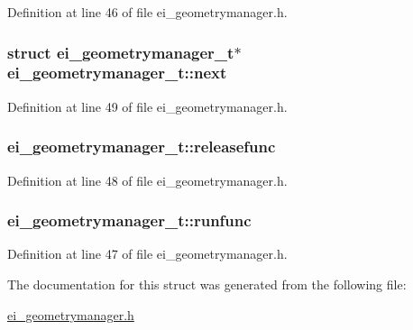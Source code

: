 Definition at line 46 of file ei\+\_\+geometrymanager.\+h.

\hypertarget{structei__geometrymanager__t_a5ac5b387d05d2fd7dcb81bb1572a2200}{
\subsubsection[{next}]{\setlength{\rightskip}{0pt plus 5cm}struct {\bf ei\+\_\+geometrymanager\+\_\+t}$\ast$ ei\+\_\+geometrymanager\+\_\+t\+::next}}\label{structei__geometrymanager__t_a5ac5b387d05d2fd7dcb81bb1572a2200}


Definition at line 49 of file ei\+\_\+geometrymanager.\+h.

\hypertarget{structei__geometrymanager__t_adb7afc019219b29a9751b56da5a23b93}{
\subsubsection[{releasefunc}]{ ei\+\_\+geometrymanager\+\_\+t\+::releasefunc}}\label{structei__geometrymanager__t_adb7afc019219b29a9751b56da5a23b93}


Definition at line 48 of file ei\+\_\+geometrymanager.\+h.

\hypertarget{structei__geometrymanager__t_a49ab7a4f7b357bdd515a8e7affccdba0}{
\subsubsection[{runfunc}]{ ei\+\_\+geometrymanager\+\_\+t\+::runfunc}}\label{structei__geometrymanager__t_a49ab7a4f7b357bdd515a8e7affccdba0}


Definition at line 47 of file ei\+\_\+geometrymanager.\+h.



The documentation for this struct was generated from the following file\+:\begin{DoxyCompactItemize}
\item 
\hyperlink{ei__geometrymanager_8h}{ei\+\_\+geometrymanager.\+h}\end{DoxyCompactItemize}
